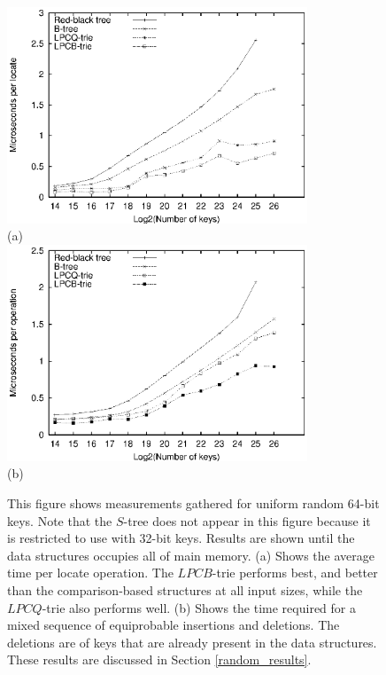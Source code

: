 \documentclass[]{acmtrans2m}
\begin{document}
\begin{figure}
\center
\includegraphics[width=0.8\textwidth]{plots/athena_locate_time.eps}\\
(a)\\
\includegraphics[width=0.8\textwidth]{plots/athena_drandom_time.eps}\\
(b)\\
\caption{
This figure shows measurements gathered for uniform random 64-bit keys. Note
that the $S$-tree does not appear in this figure because it is restricted to use with
32-bit keys. Results are shown until the data structures occupies all of main memory. 
(a) Shows the average time per locate operation. The $LPCB$-trie performs best, and better than the comparison-based
structures at all input sizes, while the $LPCQ$-trie also performs well. (b) Shows the time required for
a mixed sequence of equiprobable insertions and deletions. The deletions are of keys that are already present
in the data structures. These results are discussed in Section \ref{random_results}.}
\label{athena_locate_delete_time_fig}
\end{figure}
\end{document}

